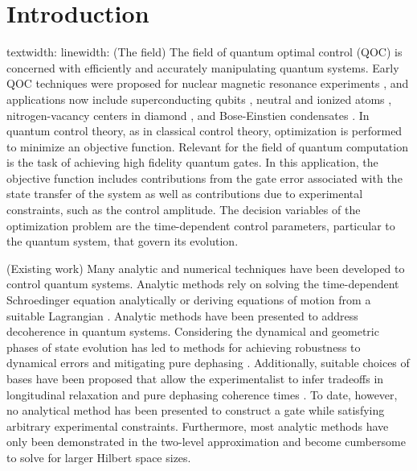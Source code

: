 \documentclass[
  amsfonts,
  amsmath,
  tbtags,
  amssymb,
  aps,
  nobibnotes,
  twocolumn,
  superscriptaddress,
]{revtex4-2}
\begin{document}
\section{Introduction}
textwidth: \prntlen{\textwidth}
linewidth: \prntlen{\linewidth}
(The field) The field of quantum optimal control (QOC) is concerned
with efficiently and accurately manipulating quantum systems.
Early QOC techniques were proposed for nuclear magnetic resonance experiments
\cite{khaneja2005optimal}, and applications now include superconducting
qubits \cite{heeres2017implementing,
  leng2019robust, leung2017speedup, xu2020nonadiabatic},
neutral and ionized atoms \cite{van2016optimal}, nitrogen-vacancy centers in
diamond \cite{rembold2020introduction}, and Bose-Einstien condensates
\cite{sorensen2018quantum}.
In quantum control theory, as in classical control theory,
optimization is performed
to minimize an objective function. Relevant for the field
of quantum computation is the task of achieving high fidelity quantum gates.
In this application, the objective function includes contributions from the
gate error associated with the state transfer of the system as well as contributions
due to experimental constraints, such as the control amplitude.
The decision variables of the optimization problem are the time-dependent control
parameters, particular to the quantum system, that govern its evolution.

(Existing work) Many analytic and numerical techniques have been developed to control
quantum systems. Analytic methods rely on solving the time-dependent
Schroedinger equation analytically or deriving equations of motion
from a suitable Lagrangian \cite{zhang2020universal, huang2020engineering, han2020experimental,
  xu2020nonadiabatic, carlini2005quantum}. Analytic methods
have been presented to address decoherence in quantum systems.
Considering the dynamical and geometric phases of state
evolution has led to methods for achieving
robustness to dynamical errors and mitigating pure dephasing
\cite{xu2020nonadiabatic, han2020experimental, merrill2014progress}.
Additionally, suitable choices of bases have been proposed that
allow the experimentalist to infer tradeoffs in longitudinal relaxation
and pure dephasing coherence times \cite{huang2020engineering}.
To date, however, no analytical method has been presented
to construct a gate while satisfying arbitrary experimental
constraints. Furthermore, most analytic methods have only
been demonstrated in the two-level approximation and become
cumbersome to solve for larger Hilbert space sizes.
\end{document}
